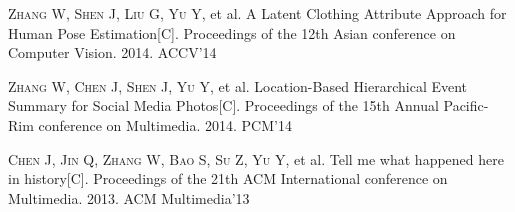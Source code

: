 
\begin{publications}{99}

    \item\textsc{Zhang W, Shen J, Liu G, Yu Y}, et al. {A Latent Clothing Attribute Approach for Human Pose Estimation}[C].
      Proceedings of the 12th Asian conference on Computer Vision. 2014. ACCV'14
      
    \item\textsc{Zhang W, Chen J, Shen J, Yu Y}, et al. {Location-Based Hierarchical Event Summary for Social Media Photos}[C].
      Proceedings of the 15th Annual Pacific-Rim conference on Multimedia. 2014. PCM'14
      
    \item\textsc{Chen J, Jin Q, Zhang W, Bao S, Su Z, Yu Y}, et al. {Tell me what happened here in history}[C].
      Proceedings of the 21th ACM International conference on Multimedia. 2013. ACM Multimedia'13

\end{publications} 